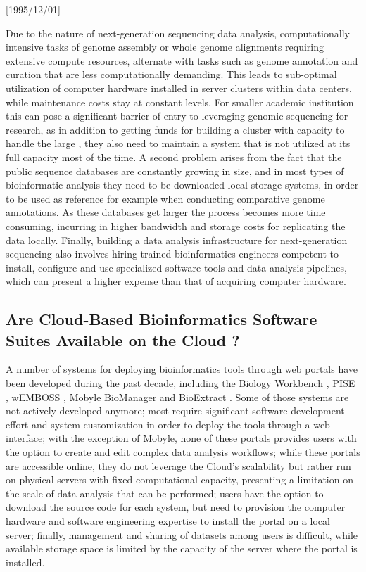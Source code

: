 \NeedsTeXFormat{LaTeX2e}[1995/12/01] \documentclass[10pt]{bmc_article}
\newenvironment{bmcformat}{\begin{raggedright}\baselineskip20pt\sloppy\setboolean{publ}{false}}{\end{raggedright}\baselineskip20pt\sloppy}
\begin{document}
\begin{bmcformat}
Due to the nature of next-generation sequencing data analysis, computationally intensive tasks of genome
assembly or whole genome alignments requiring extensive compute resources, alternate with tasks such as genome
annotation and curation that are less computationally demanding. This leads to  sub-optimal utilization of
computer hardware installed in server clusters within  data centers, while maintenance costs stay at constant
levels. For smaller academic institution this can pose a significant barrier of entry to leveraging genomic
sequencing for research, as in addition to getting funds for building a cluster with capacity to handle the
large , they also need to maintain  a system that is not utilized at its full capacity most of the time.  A
second problem arises from the fact that the public sequence databases are constantly growing in size, and in
most types of bioinformatic analysis they need to be downloaded local storage systems, in order to be used as
reference for example when conducting comparative genome annotations. As these databases get larger the
process becomes more time consuming, incurring in higher bandwidth and storage costs for replicating the data
locally.  Finally, building a data analysis infrastructure for next-generation sequencing also involves hiring
trained bioinformatics engineers competent to install, configure and use specialized software tools and data
analysis pipelines, which can present a higher expense than that of acquiring computer hardware. \pb


\subsection*{Are Cloud-Based Bioinformatics Software Suites Available on the Cloud ?}
  
A number of systems for  deploying bioinformatics tools through web portals have been
developed during the past decade, including the Biology Workbench \cite{Subramaniam1998Biology}
, PISE \cite{Letondal2001Web}, wEMBOSS \cite{Sarachu2005WEMBOSS}, Mobyle \cite{Neron2009Mobyle}
BioManager \cite{Cattley2007BioManager} and BioExtract \cite{Lushbough2008Implementing}. Some 
of those systems are not actively developed anymore; most require significant software development effort and system
customization in order to deploy the tools through a web interface; with the exception of Mobyle, none of
these portals provides users with the option to create and edit complex data analysis workflows; while these
portals are accessible online, they do not leverage the Cloud's scalability but rather run on physical servers
with fixed computational capacity, presenting a limitation on the scale of data analysis that can be
performed;  users have the option to download the source code for each system, but need to provision the 
computer hardware and software engineering expertise to install the portal on a local server; finally, management 
and sharing of datasets among users is difficult, while available storage space is limited by the capacity of the server
where the portal is installed.


\end{bmcformat}
\end{document}
